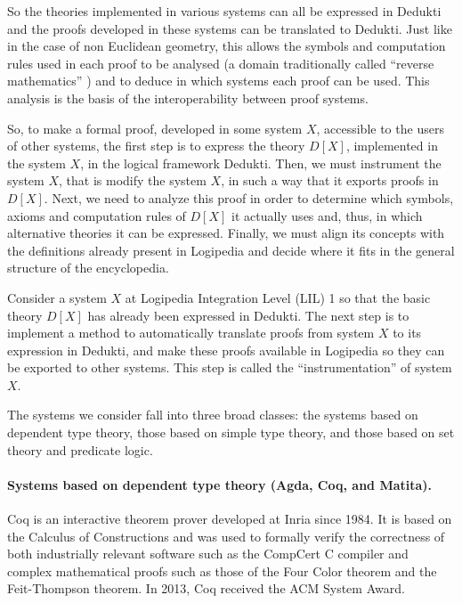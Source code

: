 So the theories implemented in various systems can all be expressed in
Dedukti and the proofs developed in these systems can be translated to
Dedukti. Just like in the case of non Euclidean geometry, this allows
the symbols and computation rules used in each proof to be analysed
\cite{Thire18,Dowek17} (a domain traditionally called ``reverse
mathematics'' \cite{Friedman75,Simpson09}) and to deduce in which
systems each proof can be used.  This analysis is the basis of the
interoperability between proof systems.

So, to make a formal proof, developed in some system $X$, accessible
to the users of other systems, the first step is to express the theory
$D[X]$, implemented in the system $X$, in the logical framework
Dedukti.  Then, we must instrument the system $X$, that is modify the
system $X$, in such a way that it exports proofs in $D[X]$.  Next, we
need to analyze this proof in order to determine which symbols, axioms
and computation rules of $D[X]$ it actually uses and, thus, in which
alternative theories it can be expressed.  Finally, we must align its
concepts with the definitions already present in Logipedia and decide
where it fits in the general structure of the encyclopedia.


Consider a system $X$ at Logipedia Integration Level (LIL) 1 so that the basic theory $D[X]$ has already
been expressed in Dedukti. The next step is to implement a method to
automatically translate proofs from system $X$ to its expression in
Dedukti, and make these proofs available in Logipedia so they can be
exported to other systems. This step is called the
``instrumentation'' of system $X$.

The systems we consider fall into three broad classes: the systems
based on dependent type theory, those based on simple type
theory, and those based on set theory and predicate logic.

\paragraph*{Systems based on dependent type theory (Agda, Coq, and Matita).}

Coq is an interactive theorem prover developed at Inria since 1984.
It is based on the Calculus of Constructions and was used to formally
verify the correctness of both industrially relevant software such as
the CompCert C compiler and complex mathematical proofs such as those
of the Four Color theorem and the Feit-Thompson theorem. In 2013, Coq
received the ACM System Award.

